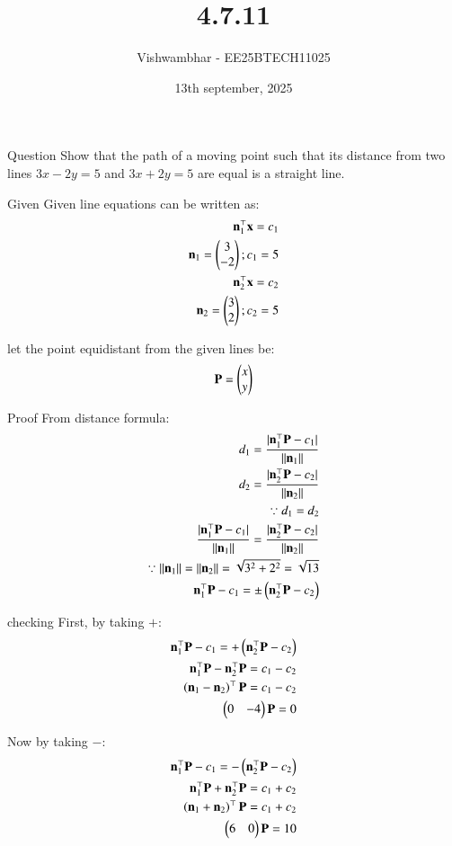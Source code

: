 \documentclass{beamer}
\title{4.7.11}
\date{13th september, 2025}
\author{Vishwambhar - EE25BTECH11025}
\begin{document}
\frame{\titlepage}
\begin{frame}{Question}
Show that the path of a moving point such that its distance from two lines  $3x-2y=5$ and $3x+2y=5$ are equal is a straight line.\\
\end{frame}

\begin{frame}{Given}
Given line equations can be written as:
\begin{align}
    \mathbf{n}_1^\top\mathbf{x}=c_1\\
    \mathbf{n}_1=\begin{pmatrix}3\\-2\end{pmatrix};c_1=5\\
    \mathbf{n}_2^\top\mathbf{x}=c_2\\
    \mathbf{n}_2=\begin{pmatrix}3\\2\end{pmatrix};c_2=5
\end{align}

let the point equidistant from the given lines be:
\begin{align}
    \mathbf{P}=\begin{pmatrix}x\\y\end{pmatrix}
\end{align}
\end{frame}

\begin{frame}{Proof}
From distance formula:
\begin{align}
    d_1=\frac{|\mathbf{n}_1^\top\mathbf{P}-c_1|}{||\mathbf{n}_1||}\\
    d_2=\frac{|\mathbf{n}_2^\top\mathbf{P}-c_2|}{||\mathbf{n}_2||}\\
    \because d_1=d_2\\
    \frac{|\mathbf{n}_1^\top\mathbf{P}-c_1|}{||\mathbf{n}_1||}=\frac{|\mathbf{n}_2^\top\mathbf{P}-c_2|}{||\mathbf{n}_2||}\\
    \because ||\mathbf{n}_1||=||\mathbf{n}_2||=\sqrt{3^2+2^2}=\sqrt{13}\\
    \mathbf{n}_1^\top\mathbf{P}-c_1=\pm\left(\mathbf{n}_2^\top\mathbf{P}-c_2\right)
\end{align}
\end{frame}

\begin{frame}{checking}
First, by taking $+$:
\begin{align}
    \mathbf{n}_1^\top\mathbf{P}-c_1=+\left(\mathbf{n}_2^\top\mathbf{P}-c_2\right)\\
    \mathbf{n}_1^\top\mathbf{P}-\mathbf{n}_2^\top\mathbf{P}=c_1-c_2\\
    \left(\mathbf{n}_1-\mathbf{n}_2\right)^\top\mathbf{P}=c_1-c_2\\
    \begin{pmatrix}0&-4\end{pmatrix}\mathbf{P}=0
\end{align}

Now by taking $-$:
\begin{align}
    \mathbf{n}_1^\top\mathbf{P}-c_1=-\left(\mathbf{n}_2^\top\mathbf{P}-c_2\right)\\
    \mathbf{n}_1^\top\mathbf{P}+\mathbf{n}_2^\top\mathbf{P}=c_1+c_2\\
    \left(\mathbf{n}_1+\mathbf{n}_2\right)^\top\mathbf{P}=c_1+c_2\\
    \begin{pmatrix}6&0\end{pmatrix}\mathbf{P}=10
\end{align}
\end{frame}
\end{document}
